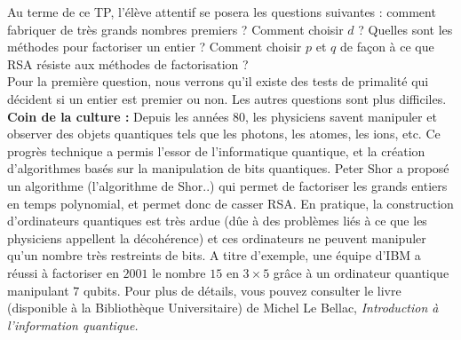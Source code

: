 Au terme de ce TP, l'élève attentif se posera les questions suivantes : comment fabriquer de très grands nombres premiers ? Comment choisir $d$ ? Quelles sont les méthodes pour factoriser un entier ? Comment choisir $p$ et $q$ de façon à ce que RSA résiste aux méthodes de factorisation ?\\

Pour la première question, nous verrons qu'il existe des tests de primalité qui décident si un entier est premier ou non. Les autres questions sont plus difficiles. \textbf{Coin de la culture :} Depuis les années $80$, les physiciens savent manipuler et observer des objets quantiques tels que les photons, les atomes, les ions, etc. Ce progrès technique a permis l'essor de l'informatique quantique, et la création d'algorithmes basés sur la manipulation de bits quantiques. Peter Shor a proposé un algorithme (l'algorithme de Shor..) qui permet de factoriser les grands entiers en temps polynomial, et permet donc de casser RSA. En pratique, la construction d'ordinateurs quantiques est très ardue (dûe à des problèmes liés à ce que les physiciens appellent la décohérence) et ces ordinateurs ne peuvent manipuler qu'un nombre très restreints de bits. A titre d'exemple, une équipe d'IBM a réussi à factoriser en $2001$ le nombre $15$ en $ 3 \times 5$ grâce à un ordinateur quantique manipulant $7$ qubits. Pour plus de détails, vous pouvez consulter le livre (disponible à la Bibliothèque Universitaire) de Michel Le Bellac, \textit{Introduction à l'information quantique.}
 
